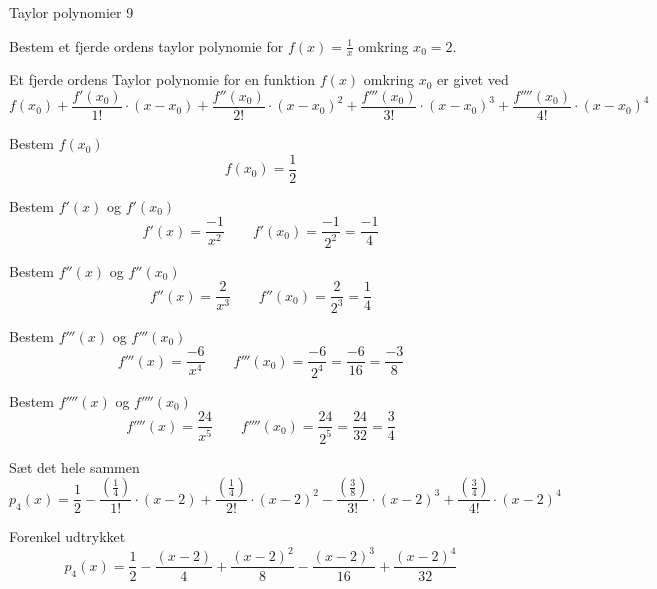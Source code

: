 \documentclass{article}
\begin{document}
\begin{exercise}{Taylor polynomier 9}

Bestem et fjerde ordens taylor polynomie for $f(x) = \frac{1}{x}$
omkring $x_0 = 2$.


\hint
Et fjerde ordens Taylor polynomie for en funktion $f(x)$
omkring $x_0$ er givet ved
\[
f(x_0) + \frac{f'(x_0)}{1!} \cdot (x - x_0)
+ \frac{f''(x_0)}{2!} \cdot (x - x_0)^2
+ \frac{f'''(x_0)}{3!} \cdot (x - x_0)^3
+ \frac{f''''(x_0)}{4!} \cdot (x - x_0)^4
\]


\hint
Bestem $f(x_0)$
\[
f(x_0) = \frac{1}{2}
\]

\hint
Bestem $f'(x)$ og $f'(x_0)$
\[
f'(x) = \frac{-1}{x^2} \qquad f'(x_0)= \frac{-1}{2^2} = \frac{-1}{4}
\]

\hint
Bestem $f''(x)$ og $f''(x_0)$
\[
f''(x) = \frac{2}{x^3} \qquad f''(x_0) = \frac{2}{2^3} = \frac{1}{4}
\]

\hint
Bestem $f'''(x)$ og $f'''(x_0)$
\[
f'''(x) = \frac{-6}{x^4} \qquad f'''(x_0) = \frac{-6}{2^4} = \frac{-6}{16} = \frac{-3}{8}
\]

\hint
Bestem $f''''(x)$ og $f''''(x_0)$
\[
f''''(x) = \frac{24}{x^5} \qquad f''''(x_0) = \frac{24}{2^5} = \frac{24}{32} = \frac{3}{4}
\]

\hint
Sæt det hele sammen
\[
p_4(x) = \frac{1}{2} - \frac{(\frac{1}{4})}{1!} \cdot (x - 2) + \frac{(\frac{1}{4}) }{2!} \cdot (x - 2)^2 - \frac{(\frac{3}{8}) }{3!} \cdot (x - 2)^3 + \frac{ (\frac{3}{4}) }{4!} \cdot (x - 2)^4
\]

\hint
Forenkel udtrykket
\[
p_4(x) = \frac{1}{2} - \frac{(x - 2)}{4} + \frac{(x - 2)^2}{8} - \frac{(x - 2)^3}{16} + \frac{(x - 2)^4}{32}
\]


\end{exercise}
\end{document}
